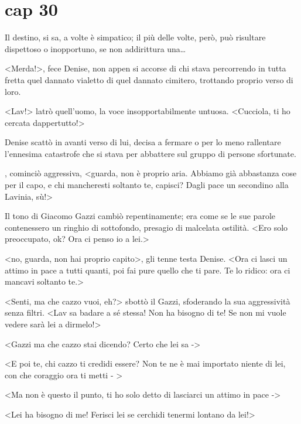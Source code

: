 \chapter{cap 30}

Il destino, si sa, a volte è simpatico; il più delle volte, però, può
risultare dispettoso o inopportuno, se non addirittura una\ldots{}

\textless{}Merda!\textgreater{}, fece Denise, non appen si accorse di
chi stava percorrendo in tutta fretta quel dannato vialetto di quel
dannato cimitero, trottando proprio verso di loro.

\textless{}Lav!\textgreater{} latrò quell'uomo, la voce
insopportabilmente untuosa. \textless{}Cucciola, ti ho cercata
dappertutto!\textgreater{}

Denise scattò in avanti verso di lui, decisa a fermare o per lo meno
rallentare l'ennesima catastrofe che si stava per abbattere sul gruppo
di persone sfortunate.

, cominciò aggressiva, \textless{}guarda, non è proprio aria. Abbiamo
già abbastanza cose per il capo, e chi mancheresti soltanto te, capisci?
Dagli pace un secondino alla Lavinia, sù!\textgreater{}

Il tono di Giacomo Gazzi cambiò repentinamente; era come se le sue
parole contenessero un ringhio di sottofondo, presagio di malcelata
ostilità. \textless{}Ero solo preoccupato, ok? Ora ci penso io a
lei.\textgreater{}

\textless{}no, guarda, non hai proprio capito\textgreater{}, gli tenne
testa Denise. \textless{}Ora ci lasci un attimo in pace a tutti quanti,
poi fai pure quello che ti pare. Te lo ridico: ora ci mancavi soltanto
te.\textgreater{}

\textless{}Senti, ma che cazzo vuoi, eh?\textgreater{} sbottò il Gazzi,
sfoderando la sua aggressività senza filtri. \textless{}Lav sa badare a
sé stessa! Non ha bisogno di te! Se non mi vuole vedere sarà lei a
dirmelo!\textgreater{}

\textless{}Gazzi ma che cazzo stai dicendo? Certo che lei sa
-\textgreater{}

\textless{}E poi te, chi cazzo ti credidi essere? Non te ne è mai
importato niente di lei, con che coraggio ora ti metti - \textgreater{}

\textless{}Ma non è questo il punto, ti ho solo detto di lasciarci un
attimo in pace -\textgreater{}

\textless{}Lei ha bisogno di me! Ferisci lei se cerchidi tenermi lontano
da lei!\textgreater{}

